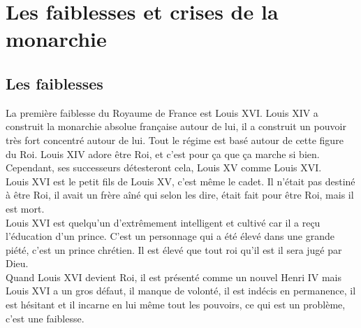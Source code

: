 \documentclass[10pt, a4paper, openany]{book}
\begin{document}
\section{Les faiblesses et crises de la monarchie}

\subsection{Les faiblesses}

La première faiblesse du Royaume de France est Louis XVI. Louis XIV a construit la monarchie absolue française autour de lui, il a construit un pouvoir très fort concentré autour de lui. Tout le régime est basé autour de cette figure du Roi. Louis XIV adore être Roi, et c'est pour ça que ça marche si bien. Cependant, ses successeurs détesteront cela, Louis XV comme Louis XVI. \\
Louis XVI est le petit fils de Louis XV, c'est même le cadet. Il n'était pas destiné à être Roi, il avait un frère aîné qui selon les dire, était fait pour être Roi, mais il est mort. \\
Louis XVI est quelqu'un d'extrêmement intelligent et cultivé car il a reçu l'éducation d'un prince. C'est un personnage qui a été élevé dans une grande piété, c'est un prince chrétien. Il est élevé que tout roi qu'il est il sera jugé par Dieu. \\
Quand Louis XVI devient Roi, il est présenté comme un nouvel Henri IV mais Louis XVI a un gros défaut, il manque de volonté, il est indécis en permanence, il est hésitant et il incarne en lui même tout les pouvoirs, ce qui est un problème, c'est une faiblesse. 
\end{document}
